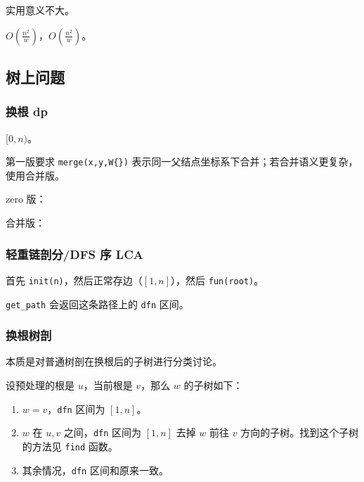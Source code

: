 \documentclass[12pt]{ctexart}
\begin{document}
实用意义不大。

$O(\frac{n^2}w)$，$O(\frac {n^2}w)$。





\subsection{树上问题}

\subsubsection{换根 dp}

$[0,n)$。

第一版要求 \verb|merge(x,y,W{})| 表示同一父结点坐标系下合并；若合并语义更复杂，使用合并版。

zero 版：



合并版：




\subsubsection{轻重链剖分/DFS 序 LCA}

首先 \verb|init(n)|，然后正常存边（$[1,n]$），然后 \verb|fun(root)|。

\verb|get_path| 会返回这条路径上的 \verb|dfn| 区间。



\subsubsection{换根树剖}

本质是对普通树剖在换根后的子树进行分类讨论。

设预处理的根是 $u$，当前根是 $v$，那么 $w$ 的子树如下：

\begin{enumerate}
	\item $w=v$，\verb|dfn| 区间为 $[1,n]$。
	\item $w$ 在 $u,v$ 之间，\verb|dfn| 区间为 $[1,n]$ 去掉 $w$ 前往 $v$ 方向的子树。找到这个子树的方法见 \verb|find| 函数。
	\item 其余情况，\verb|dfn| 区间和原来一致。
\end{enumerate}
\end{document}
